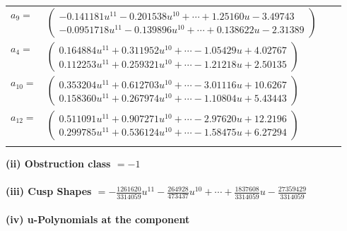 \documentclass[1p]{elsarticle_modified}
\theoremstyle{definition}
\begin{document}
\begin{tabular}{m{7pt} m{180pt} m{7pt} m{180pt} }
\flushright $a_{9}=$&$\begin{pmatrix}-0.141181 u^{11}-0.201538 u^{10}+\cdots+1.25160 u-3.49743\\-0.0951718 u^{11}-0.139896 u^{10}+\cdots+0.138622 u-2.31389\end{pmatrix}$ \\
\flushright $a_{4}=$&$\begin{pmatrix}0.164884 u^{11}+0.311952 u^{10}+\cdots-1.05429 u+4.02767\\0.112253 u^{11}+0.259321 u^{10}+\cdots-1.21218 u+2.50135\end{pmatrix}$ \\
\flushright $a_{10}=$&$\begin{pmatrix}0.353204 u^{11}+0.612703 u^{10}+\cdots-3.01116 u+10.6267\\0.158360 u^{11}+0.267974 u^{10}+\cdots-1.10804 u+5.43443\end{pmatrix}$ \\
\flushright $a_{12}=$&$\begin{pmatrix}0.511091 u^{11}+0.907271 u^{10}+\cdots-2.97620 u+12.2196\\0.299785 u^{11}+0.536124 u^{10}+\cdots-1.58475 u+6.27294\end{pmatrix}$\\&\end{tabular}
\flushleft \textbf{(ii) Obstruction class $= -1$}\\~\\
\flushleft \textbf{(iii) Cusp Shapes $= -\frac{1261620}{3314059} u^{11}-\frac{264928}{473437} u^{10}+\cdots+\frac{1837608}{3314059} u-\frac{27359429}{3314059}$}\\~\\
\newpage\renewcommand{\arraystretch}{1}
\flushleft \textbf{(iv) u-Polynomials at the component}\newline \\
\end{document}
